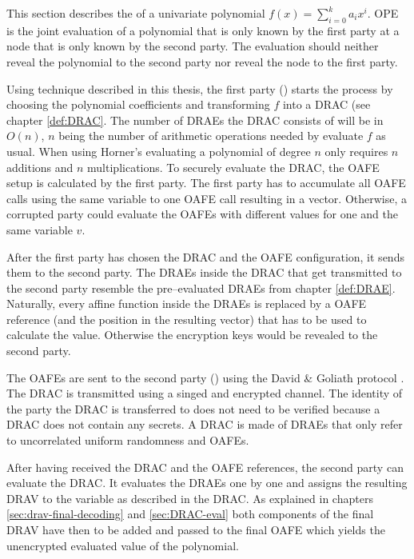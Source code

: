 %
%
\label{sec:OPE}

This section describes the  of a
univariate polynomial $f(x) = \sum_{i=0}^k a_ix^i$. OPE is the joint evaluation
of a polynomial that is only known by the first party at a node that is only
known by the second party. The evaluation should neither reveal the polynomial
to the second party nor reveal the node to the first party.

Using technique described in this thesis, the first party (\JWpOne{}) starts the
process by choosing the polynomial coefficients and transforming  $f$ into a
DRAC (see chapter \ref{def:DRAC}. The number of DRAEs the DRAC consists of will
be in $O(n)$, $n$ being the number of arithmetic operations needed by evaluate
$f$ as usual. When using Horner's \cite{cormen01} evaluating a polynomial of
degree $n$ only requires $n$ additions and $n$ multiplications. To securely
evaluate the DRAC, the OAFE setup is calculated by the first party. The first
party has to accumulate all OAFE calls using the same variable to one OAFE call
resulting in a vector. Otherwise, a corrupted party could evaluate the OAFEs
with different values for one and the same variable $v$.

After the first party has chosen the DRAC and the OAFE configuration, it sends
them to the second party. The DRAEs inside the DRAC that get transmitted to the
second party resemble the pre--evaluated DRAEs from chapter \ref{def:DRAE}.
Naturally, every affine function inside the DRAEs is replaced by a OAFE
reference (and the position in the resulting vector) that has to be used to
calculate the value. Otherwise the encryption keys would be revealed to the
second party.

The OAFEs are sent to the second party (\JWpTwo{}) using the David \& Goliath
protocol \cite{davidgoliath}. The DRAC is transmitted using a singed and
encrypted channel. The identity of the party the DRAC is transferred to does not
need to be verified because a DRAC does not contain any secrets. A DRAC is made
of DRAEs that only refer to uncorrelated uniform randomness and OAFEs.

After having received the DRAC and the OAFE references, the second party can
evaluate the DRAC\@. It evaluates the DRAEs one by one and assigns the resulting
DRAV to the variable as described in the DRAC\@. As explained in chapters
\ref{sec:drav-final-decoding} and \ref{sec:DRAC-eval} both components of the
final DRAV have then to be added and passed to the final OAFE which yields the
unencrypted evaluated value of the polynomial.


